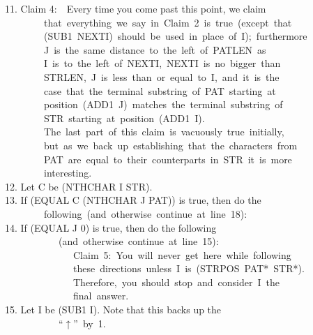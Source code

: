 \documentclass[10pt]{book}
\newenvironment{pubasis}{\begin{flushleft}}{\end{flushleft}}
\begin{document}
\begin{pubasis}
11.	Claim 4:~~Every time you come past this point, we claim\\
~~~~~~~~that~everything~we~say~in~Claim~2~is~true~(except~that\\
~~~~~~~~(SUB1~NEXTI)~should~be~used~in~place~of~I);~furthermore\\
~~~~~~~~J~is~the~same~distance~to~the~left~of~PATLEN~as\\
~~~~~~~~I~is~to~the~left~of~NEXTI,~NEXTI~is~no~bigger~than\\
~~~~~~~~STRLEN,~J~is~less~than~or~equal~to~I,~and~it~is~the\\
~~~~~~~~case~that~the~terminal~substring~of~PAT~starting~at\\
~~~~~~~~position~(ADD1~J)~matches~the~terminal~substring~of\\
~~~~~~~~STR~starting~at~position~(ADD1~I).\\

~~~~~~~~The~last~part~of~this~claim~is~vacuously~true~initially,\\
~~~~~~~~but~as~we~back~up~establishing~that~the~characters~from\\
~~~~~~~~PAT~are~equal~to~their~counterparts~in~STR~it~is~more\\
~~~~~~~~interesting.\\

12.	Let C be (NTHCHAR I STR).\\

13.	If (EQUAL C (NTHCHAR J PAT)) is true, then do the\\
~~~~~~~~following~(and~otherwise~continue~at~line~18):\\

14.	   If (EQUAL J 0) is true, then do the following\\
~~~~~~~~~~~(and~otherwise~continue~at~line~15):\\

~~~~~~~~~~~~~~Claim~5:~You~will~never~get~here~while~following\\
~~~~~~~~~~~~~~these~directions~unless~I~is~(STRPOS~PAT*~STR*).\\

~~~~~~~~~~~~~~Therefore,~you~should~stop~and~consider~I~the\\
~~~~~~~~~~~~~~final~answer.\\

15.	   Let I be (SUB1 I).  Note that this backs up the\\
~~~~~~~~~~~``$\uparrow$''~by~1.\\


\end{pubasis}
\end{document}
